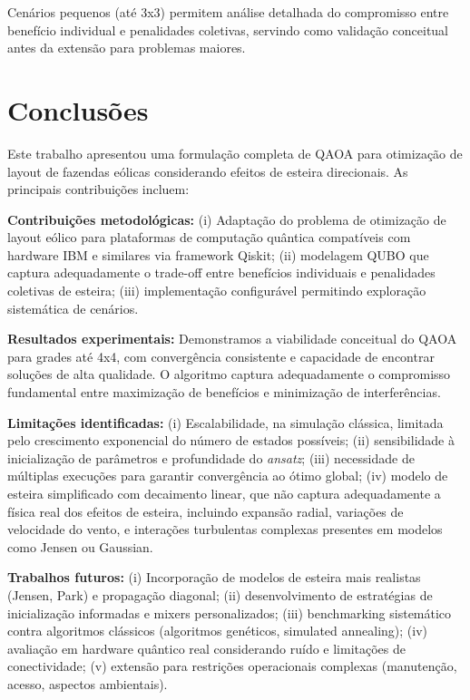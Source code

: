 \documentclass{weciq}
\begin{document}
Cenários pequenos (até 3x3) permitem análise detalhada do compromisso entre benefício individual e penalidades coletivas, servindo como validação conceitual antes da extensão para problemas maiores.

\section{Conclusões}

Este trabalho apresentou uma formulação completa de QAOA para otimização de layout de fazendas eólicas considerando efeitos de esteira direcionais. As principais contribuições incluem:

\textbf{Contribuições metodológicas:} (i) Adaptação do problema de otimização de layout eólico para plataformas de computação quântica compatíveis com hardware IBM e similares via framework Qiskit; (ii) modelagem QUBO que captura adequadamente o trade-off entre benefícios individuais e penalidades coletivas de esteira; (iii) implementação configurável permitindo exploração sistemática de cenários.

\textbf{Resultados experimentais:} Demonstramos a viabilidade conceitual do QAOA para grades até 4x4, com convergência consistente e capacidade de encontrar soluções de alta qualidade. O algoritmo captura adequadamente o compromisso fundamental entre maximização de benefícios e minimização de interferências.

\textbf{Limitações identificadas:} (i) Escalabilidade, na simulação clássica, limitada pelo crescimento exponencial do número de estados possíveis; (ii) sensibilidade à inicialização de parâmetros e profundidade do \textit{ansatz}; (iii) necessidade de múltiplas execuções para garantir convergência ao ótimo global; (iv) modelo de esteira simplificado com decaimento linear, que não captura adequadamente a física real dos efeitos de esteira, incluindo expansão radial, variações de velocidade do vento, e interações turbulentas complexas presentes em modelos como Jensen ou Gaussian.

\textbf{Trabalhos futuros:} (i) Incorporação de modelos de esteira mais realistas (Jensen, Park) e propagação diagonal; (ii) desenvolvimento de estratégias de inicialização informadas e mixers personalizados; (iii) benchmarking sistemático contra algoritmos clássicos (algoritmos genéticos, simulated annealing); (iv) avaliação em hardware quântico real considerando ruído e limitações de conectividade; (v) extensão para restrições operacionais complexas (manutenção, acesso, aspectos ambientais).
\end{document}
